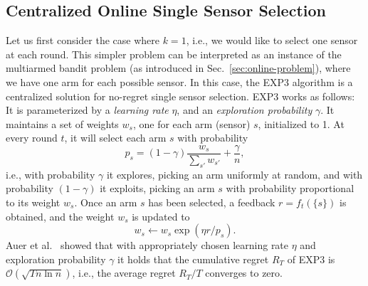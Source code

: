 \documentclass{sig-alternate-dan}
\numberwithin{equation}{section}
\newcommand{\algofont}[1]{\textsc{#1}}
\newcommand{\cO}{\mathcal{O}}
\newcommand{\EXPthree}{{\algofont{EXP3}}\xspace}
\newcommand{\numsensors}{\ensuremath{n}}
\newcommand{\obj}{\ensuremath{f}} %
\newcommand{\ignore}[1]{}
\newcommand{\secref}[1]{Sec.~\ref{#1}}
\begin{document}
  
\ignore{
As we will
show, the key problem will be to develop an online algorithm for selecting a
\emph{single} sensor, which we consider in
\secref{sec:centralized-sampling}. 

In \secref{sec:centralized-multi}
we present our algorithm for selecting multiple sensors,
which relies on the single sensor case as a subroutine.
} %

\subsection{Centralized Online  Single Sensor Selection} \label{sec:centralized-sampling}
Let us first consider the case where $k=1$, i.e., we would like to
select one sensor at each round.  This simpler problem can be
interpreted as an instance of the multiarmed bandit problem (as
introduced in \secref{sec:online-problem}), where we have one arm for
each possible sensor.  In this case, the \EXPthree algorithm
\cite{auer02} is a centralized solution for no-regret single sensor
selection.
%
%
%
\EXPthree works as follows: It
is parameterized by a \emph{learning rate} $\eta$, and an
\emph{exploration probability} $\gamma$. It maintains a set of weights
$w_{s}$, one for each arm (sensor) $s$, initialized to
1. %
At every round $t$,
it will select each arm $s$ with probability
$$p_{s}=(1-\gamma)\frac{w_{s}}{\sum_{s'}
  w_{s'}}+\frac{\gamma}{\numsensors},$$ i.e., with probability $\gamma$
it explores, picking an arm uniformly at random, and with probability
$(1-\gamma)$ it exploits, picking an arm $s$ with probability
proportional to its weight $w_{s}$.  Once an arm $s$ has been
selected, a feedback $r=\obj_{t}(\{s\})$ is obtained, and the weight $w_{s}$ is
updated to
$$w_{s}\leftarrow w_{s}\exp(\eta r/p_{s}).$$ 
Auer et al.~\cite{auer02} showed that
with appropriately chosen learning rate $\eta$ and exploration
probability $\gamma$ it holds that the cumulative regret $R_{T}$ of
\EXPthree is $\cO(\sqrt{T \numsensors \ln \numsensors })$, i.e., the
average regret $R_{T}/T$ converges to zero.
\end{document}
